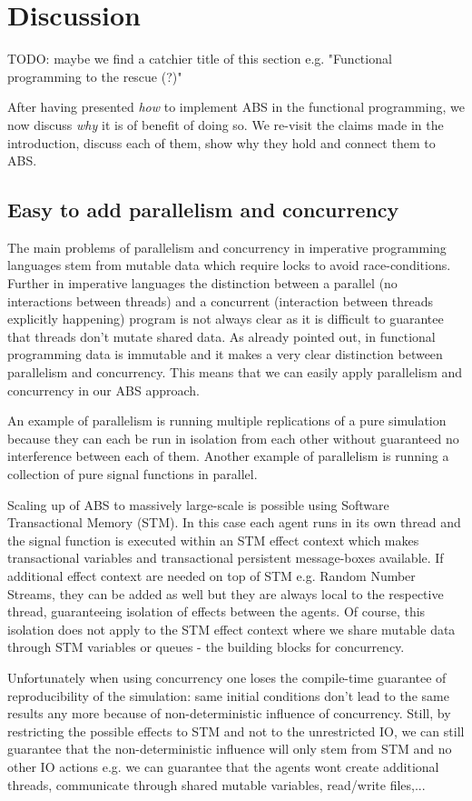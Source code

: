 \section{Discussion}
TODO: maybe we find a catchier title of this section e.g. "Functional programming to the rescue (?)"

After having presented \textit{how} to implement ABS in the functional programming, we now discuss \textit{why} it is of benefit of doing so. We re-visit the claims made in the introduction, discuss each of them, show why they hold and connect them to ABS.

\subsection{Easy to add parallelism and concurrency}
The main problems of parallelism and concurrency in imperative programming languages stem from mutable data which require locks to avoid race-conditions. Further in imperative languages the distinction between a parallel (no interactions between threads) and a concurrent (interaction between threads explicitly happening) program is not always clear as it is difficult to guarantee that threads don't mutate shared data. As already pointed out, in functional programming data is immutable and it makes a very clear distinction between parallelism and concurrency. This means that we can easily apply parallelism and concurrency in our ABS approach.

An example of parallelism is running multiple replications of a pure simulation because they can each be run in isolation from each other without guaranteed no interference between each of them. Another example of parallelism is running a collection of pure signal functions in parallel.

Scaling up of ABS to massively large-scale is possible using Software Transactional Memory (STM). In this case each agent runs in its own thread and the signal function is executed within an STM effect context which makes transactional variables and transactional persistent message-boxes available.  If additional effect context are needed on top of STM e.g. Random Number Streams, they can be added as well but they are always local to the respective thread, guaranteeing isolation of effects between the agents. Of course, this isolation does not apply to the STM effect context where we share mutable data through STM variables or queues - the building blocks for concurrency. 

Unfortunately when using concurrency one loses the compile-time guarantee of reproducibility of the simulation: same initial conditions don't lead to the same results any more because of non-deterministic influence of concurrency. Still, by restricting the possible effects to STM and not to the unrestricted IO, we can still guarantee that the non-deterministic influence will only stem from STM and no other IO actions e.g. we can guarantee that the agents wont create additional threads, communicate through shared mutable variables, read/write files,...

